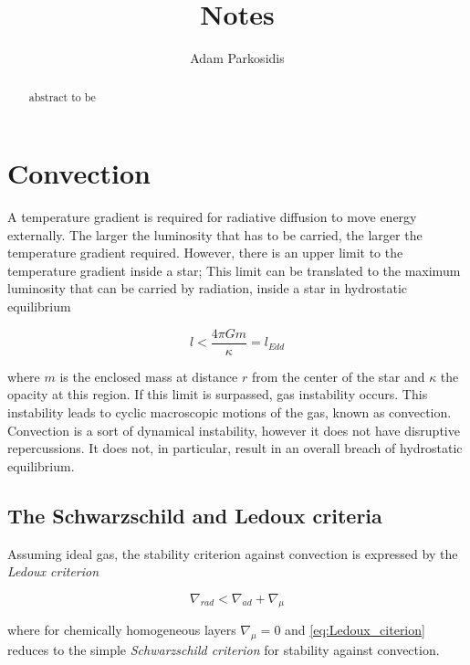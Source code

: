 \documentclass[aps,prb,twocolumn,superscriptaddress,floatfix,longbibliography]{revtex4-2}
\newcommand{\mytitle}{Notes}
\begin{document}
\title{\mytitle}

\author{Adam Parkosidis}

\begin{abstract}
abstract to be
\end{abstract}
\maketitle

\section{Convection}

A temperature gradient is required for radiative diffusion to move energy externally. The larger the luminosity that has to be carried, the larger the temperature gradient required. However, there is an upper limit to the temperature gradient inside a star; This limit can be translated to the maximum luminosity that can be carried by radiation, inside a star in hydrostatic equilibrium

\begin{equation}\label{eq:eddington_luminosity}
    l < \frac{4 \pi G m}{\kappa} = l_{Edd}
\end{equation}

where $m$ is the enclosed mass at distance $r$ from the center of the star and $\kappa$ the opacity at this region. If this limit is surpassed, gas instability occurs.  This instability leads to cyclic macroscopic motions of the gas, known as convection. Convection is a sort of dynamical instability, however it does not have disruptive repercussions. It does not, in particular, result in an overall breach of hydrostatic equilibrium.


\subsection{The Schwarzschild and Ledoux criteria}

Assuming ideal gas, the stability criterion against convection is expressed by the {\it Ledoux criterion}

\begin{equation}\label{eq:Ledoux_citerion}
    \nabla_{rad} < \nabla_{ad} + \nabla_{\mu}
\end{equation}

where for chemically homogeneous layers $\nabla_{\mu} = 0$ and \cref{eq:Ledoux_citerion} reduces to the simple {\it Schwarzschild criterion} for stability against convection.
\end{document}
